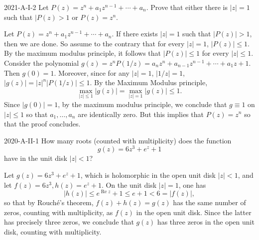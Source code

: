 \documentclass{article}
\begin{document}
	\begin{prb}{2021-A-I-2}
		Let $P(z)= z^{n} + a_{1}z^{n-1} + \dotsm + a_{n}$. Prove that either there is $|z| = 1$ such that $|P(z) > 1$ or $P(z) = z^{n}$. 
	\end{prb}
	Let $P(z) = z^{n} + a_{1}z^{n-1} + \dotsm + a_{n}$. If there exists $|z| = 1$ such that $|P(z)| > 1$, then we are done. So assume to the contrary that for every $|z| = 1$, $|P(z)| \leq 1$. By the maximum modulus principle, it follows that $|P(z)| \leq 1$ for every $|z| \leq 1$. Consider the polynomial $g(z) = z^{n}P(1/z) = a_{n}z^{n} + a_{n-1}z^{n-1} + \dotsm + a_{1}z + 1$. Then $g(0) = 1$. Moreover, since for any $|z| = 1$, $|1/z| = 1$, $|g(z)| = |z|^{n}|P(1/z)| \leq 1$. By the Maximum Modulus principle, 
	\begin{equation*}
		\max_{|z| \leq 1}|g(z)| = \max_{|z| = 1}|g(z)| \leq 1. 
	\end{equation*}
	Since $|g(0)| = 1$, by the maximum modulus principle, we conclude that $g \equiv 1$ on $|z| \leq 1$ so that $a_{1}, \ldots, a_{n}$ are identically zero. But this implies that $P(z)= z^{n}$ so that the proof concludes. 
	
	\begin{prb}{2020-A-II-1}
		How many roots (counted with multiplicity) does the function 
		\begin{equation*}
			g(z) = 6z^{3} + e^{z} + 1
		\end{equation*}
		have in the unit disk $|z| < 1$?
	\end{prb}
	Let $g(z) = 6z^{3} + e^{z} + 1$, which is holomorphic in the open unit disk $|z| < 1$, and let $f(z) = 6z^{3}, h(z) = e^{z} + 1$. On the unit disk $|z| = 1$, one has 
	\begin{equation*}
		|h(z)| \leq e^{\operatorname{Re}{z}} + 1 \leq e + 1 < 6 = |f(z)|, 
	\end{equation*}
	so that by Rouch\'e's theorem, $f(z) + h(z) = g(z)$ has the same number of zeros, counting with multiplicity, as $f(z)$ in the open unit disk. Since the latter has precisely three zeros, we conclude that $g(z)$ has three zeros in the open unit disk, counting with multiplicity. 
	
\end{document}
